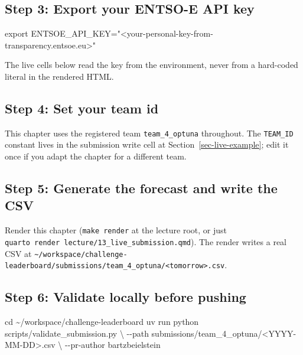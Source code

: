 \documentclass[
  english,
  letterpaper,
]{scrbook}
\newenvironment{Shaded}{\begin{snugshade}}{\end{snugshade}}
\newcommand{\AttributeTok}[1]{\textcolor[rgb]{0.40,0.45,0.13}{#1}}
\newcommand{\BuiltInTok}[1]{\textcolor[rgb]{0.00,0.23,0.31}{#1}}
\newcommand{\DataTypeTok}[1]{\textcolor[rgb]{0.68,0.00,0.00}{#1}}
\newcommand{\ExtensionTok}[1]{\textcolor[rgb]{0.00,0.23,0.31}{#1}}
\newcommand{\NormalTok}[1]{\textcolor[rgb]{0.00,0.23,0.31}{#1}}
\newcommand{\OperatorTok}[1]{\textcolor[rgb]{0.37,0.37,0.37}{#1}}
\newcommand{\StringTok}[1]{\textcolor[rgb]{0.13,0.47,0.30}{#1}}
\newcommand{\VariableTok}[1]{\textcolor[rgb]{0.07,0.07,0.07}{#1}}
\begin{document}
\subsection{Step 3: Export your ENTSO-E API
key}\label{step-3-export-your-entso-e-api-key}

\begin{Shaded}
\begin{Highlighting}[]
\BuiltInTok{export} \VariableTok{ENTSOE\_API\_KEY}\OperatorTok{=}\StringTok{"\textless{}your{-}personal{-}key{-}from{-}transparency.entsoe.eu\textgreater{}"}
\end{Highlighting}
\end{Shaded}

The live cells below read the key from the environment, never from a
hard-coded literal in the rendered HTML.

\subsection{Step 4: Set your team id}\label{step-4-set-your-team-id}

This chapter uses the registered team \texttt{team\_4\_optuna}
throughout. The \texttt{TEAM\_ID} constant lives in the submission write
cell at Section~\ref{sec-live-example}; edit it once if you adapt the
chapter for a different team.

\subsection{Step 5: Generate the forecast and write the
CSV}\label{step-5-generate-the-forecast-and-write-the-csv}

Render this chapter (\texttt{make\ render} at the lecture root, or just
\texttt{quarto\ render\ lecture/13\_live\_submission.qmd}). The render
writes a real CSV at
\texttt{\textasciitilde{}/workspace/challenge-leaderboard/submissions/team\_4\_optuna/\textless{}tomorrow\textgreater{}.csv}.

\subsection{Step 6: Validate locally before
pushing}\label{step-6-validate-locally-before-pushing}

\begin{Shaded}
\begin{Highlighting}[]
\BuiltInTok{cd}\NormalTok{ \textasciitilde{}/workspace/challenge{-}leaderboard}
\ExtensionTok{uv}\NormalTok{ run python scripts/validate\_submission.py }\DataTypeTok{\textbackslash{}}
    \AttributeTok{{-}{-}path}\NormalTok{ submissions/team\_4\_optuna/}\OperatorTok{\textless{}}\NormalTok{YYYY{-}MM{-}DD}\OperatorTok{\textgreater{}}\NormalTok{.csv }\DataTypeTok{\textbackslash{}}
    \AttributeTok{{-}{-}pr{-}author}\NormalTok{ bartzbeielstein}
\end{Highlighting}
\end{Shaded}
\end{document}

